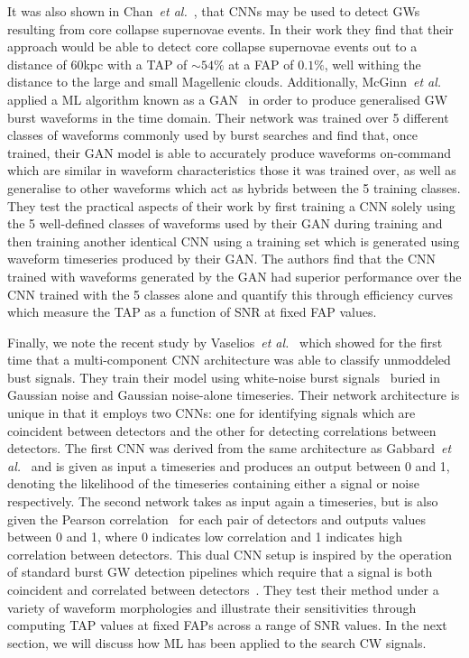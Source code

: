 %
% 
It was also shown in Chan~\textit{et al.}~\cite{PhysRevD.102.043022}, 
that \ac{CNN}s may be used to detect \ac{GW}s resulting from 
core collapse supernovae events. In their work they find that 
their approach would be able to detect core collapse supernovae 
events out to a distance of 60kpc with a \ac{TAP} of $\sim 54\%$ 
at a \ac{FAP} of $0.1\%$, well withing the distance to the large and 
small Magellenic clouds. Additionally, 
McGinn~\textit{et al.}~\cite{2021CQGra..38o5005M} 
applied a \ac{ML} algorithm known as a \ac{GAN}~\cite{1406.2661} 
in order to produce generalised 
\ac{GW} burst waveforms in the time domain. Their network was trained 
over 5 different classes of waveforms commonly used by burst searches 
and find that, once trained, their \ac{GAN} model is able to 
accurately produce waveforms on-command which are similar in waveform 
characteristics those it was trained over, as well as generalise to 
other waveforms which act as hybrids between the 5 training classes. 
They test the practical aspects of their work by first training a \ac{CNN} 
solely using the 5 well-defined classes of waveforms used by their 
\ac{GAN} during training and then training another identical \ac{CNN} 
using a training set which is generated using waveform timeseries produced 
by their \ac{GAN}. The authors find that the \ac{CNN} trained with 
waveforms generated by the \ac{GAN} had superior performance over 
the \ac{CNN} trained with the 5 classes alone and quantify this 
through efficiency curves which measure the \ac{TAP} as a function 
of \ac{SNR} at fixed \ac{FAP} values.

%
%
Finally, we note the recent study by 
Vaselios~\textit{et al.}~\cite{2020arXiv200914611S} 
which showed for the first time that a multi-component \ac{CNN} architecture 
was able to classify unmoddeled bust signals. They train their model 
using white-noise burst signals~\cite{Sutton_2010} buried in Gaussian noise 
and Gaussian noise-alone timeseries. Their network architecture is unique 
in that it employs two \ac{CNN}s: one for identifying signals which are 
coincident between detectors and the other for detecting correlations 
between detectors. The first \ac{CNN} was derived from the same architecture 
as Gabbard~\textit{et al.}~\cite{PhysRevLett.120.141103} 
and is given as input a timeseries and 
produces an output between 0 and 1, denoting the likelihood of the timeseries 
containing either a signal or noise respectively. The second network takes 
as input again a timeseries, but is also given the 
Pearson correlation~\cite{2020arXiv200914611S} for each pair of detectors 
and outputs values between 0 and 1, 
where 0 indicates low correlation and 1 indicates high correlation between detectors. This dual \ac{CNN} setup is inspired by the operation of 
standard burst \ac{GW} detection pipelines which require that a signal 
is both coincident and correlated between
detectors~\cite{2020arXiv200914611S}. They test their 
method under a variety of waveform morphologies and illustrate their 
sensitivities through computing \ac{TAP} values at fixed \ac{FAP}s across 
a range of \ac{SNR} values. In the next section, we will discuss how 
\ac{ML} has been applied to the search \ac{CW} signals.

